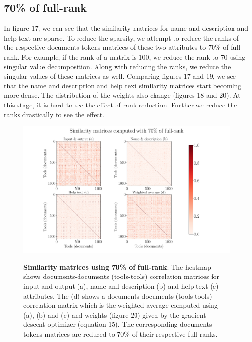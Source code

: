 \subsection{70\% of full-rank}
In figure 17, we can see that the similarity matrices for name and description and help text are sparse. To reduce the sparsity,  we attempt to reduce the ranks of the respective documents-tokens matrices of these two attributes to 70\% of full-rank. For example, if the rank of a matrix is 100, we reduce the rank to 70 using singular value decomposition. Along with reducing the ranks, we reduce the singular values of these matrices as well. Comparing figures 17 and 19, we see that the name and description and help text similarity matrices start becoming more dense. The distribution of the weights also change (figures 18 and 20). At this stage, it is hard to see the effect of rank reduction. Further we reduce the ranks drastically to see the effect.

\begin{figure}[h]
\begin{centering}
    {\includegraphics[scale=0.4]{figures/Similarity_matrices_070.pdf}}
    \caption[Similarity matrices computed using document-tokens matrices reduced to 70\% of their full-rank]{\textbf{Similarity matrices using 70\% of full-rank}: The heatmap shows documents-documents (tools-tools) correlation matrices for input and output (a), name and description (b) and help text (c) attributes. The (d) shows a documents-documents (tools-tools) correlation matrix which is the weighted average computed using (a), (b) and (c) and weights (figure 20) given by the gradient descent optimizer (equation 15). The corresponding documents-tokens matrices are reduced to 70\% of their respective full-ranks.}
\end{centering}
\end{figure}

